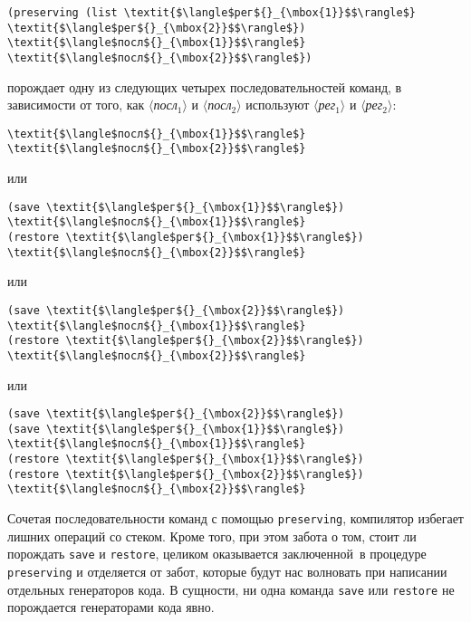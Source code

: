 \begin{Verbatim}[fontsize=\small]
(preserving (list \textit{$\langle$рег${}_{\mbox{1}}$$\rangle$} \textit{$\langle$рег${}_{\mbox{2}}$$\rangle$}) \textit{$\langle$посл${}_{\mbox{1}}$$\rangle$} \textit{$\langle$посл${}_{\mbox{2}}$$\rangle$})
\end{Verbatim}
порождает одну из следующих четырех последовательностей команд, в
зависимости от того, как \textit{$\langle$посл${}_{\mbox{1}}$$\rangle$}
и \textit{$\langle$посл${}_{\mbox{2}}$$\rangle$} используют
\textit{$\langle$рег${}_{\mbox{1}}$$\rangle$} и
\textit{$\langle$рег${}_{\mbox{2}}$$\rangle$}:

\begin{Verbatim}[fontsize=\small]
\textit{$\langle$посл${}_{\mbox{1}}$$\rangle$}
\textit{$\langle$посл${}_{\mbox{2}}$$\rangle$}
\end{Verbatim}
или

\begin{Verbatim}[fontsize=\small]
(save \textit{$\langle$рег${}_{\mbox{1}}$$\rangle$})
\textit{$\langle$посл${}_{\mbox{1}}$$\rangle$}
(restore \textit{$\langle$рег${}_{\mbox{1}}$$\rangle$})
\textit{$\langle$посл${}_{\mbox{2}}$$\rangle$}
\end{Verbatim}
или

\begin{Verbatim}[fontsize=\small]
(save \textit{$\langle$рег${}_{\mbox{2}}$$\rangle$})
\textit{$\langle$посл${}_{\mbox{1}}$$\rangle$}
(restore \textit{$\langle$рег${}_{\mbox{2}}$$\rangle$})
\textit{$\langle$посл${}_{\mbox{2}}$$\rangle$}
\end{Verbatim}
или

\begin{Verbatim}[fontsize=\small]
(save \textit{$\langle$рег${}_{\mbox{2}}$$\rangle$})
(save \textit{$\langle$рег${}_{\mbox{1}}$$\rangle$})
\textit{$\langle$посл${}_{\mbox{1}}$$\rangle$}
(restore \textit{$\langle$рег${}_{\mbox{1}}$$\rangle$})
(restore \textit{$\langle$рег${}_{\mbox{2}}$$\rangle$})
\textit{$\langle$посл${}_{\mbox{2}}$$\rangle$}
\end{Verbatim}

Сочетая последовательности команд с помощью
{\tt preserving}, компилятор избегает лишних операций со
стеком.  Кроме того, при этом забота о том, стоит ли порождать
{\tt save} и {\tt restore}, целиком оказывается
заключенной~в процедуре {\tt preserving} и отделяется от забот,
которые будут нас волновать при написании отдельных генераторов кода.
В сущности, ни одна команда {\tt save} или
{\tt restore} не порождается генераторами кода явно.

